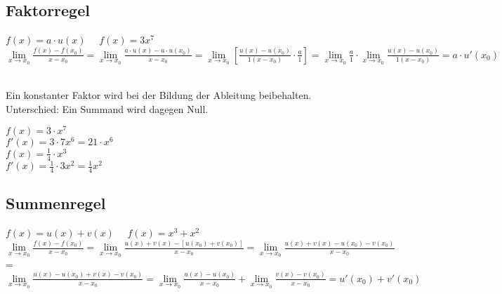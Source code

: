 \subsection{Faktorregel}
$f(x) = a\cdot u(x)\quad$ \zB $f(x)=3x^7$\\
$\lim\limits_{x \rightarrow x_0}{\frac{f(x)-f(x_0)}{x-x_0}} =
\lim\limits_{x \rightarrow x_0}{\frac{a\cdot u(x)-a\cdot u(x_0)}{x-x_0}} =
\lim\limits_{x \rightarrow x_0}{[\frac{u(x)-u(x_0)}{1(x-x_0)}\cdot\frac{a}{1}]} =
\lim\limits_{x \rightarrow x_0}{\frac{a}{1}}\cdot\lim\limits_{x \rightarrow x_0}{\frac{u(x)-u(x_0)}{1(x-x_0)}} =
a\cdot u'(x_0)$

\vspace{0.2cm}
\\
Ein konstanter Faktor wird bei der Bildung der Ableitung beibehalten.\\
Unterschied: Ein Summand wird dagegen Null.

\begin{multicols}{2}
$f(x) = 3\cdot x^7$\\
$f'(x) = 3\cdot 7x^6 = 21\cdot x^6$\\
$f(x) = \frac{1}{4}\cdot x^3$\\
$f'(x) = \frac{1}{4}\cdot 3x^2 = \frac{1}{4}x^2$
\end{multicols}


\subsection{Summenregel}
$f(x) = u(x)+v(x)\quad$ \zB $f(x)=x^3+x^2$\\
$\lim\limits_{x \rightarrow x_0}{\frac{f(x)-f(x_0)}{x-x_0}} =
\lim\limits_{x \rightarrow x_0}{\frac{u(x)+v(x)-[u(x_0)+v(x_0)]}{x-x_0}} =
\lim\limits_{x \rightarrow x_0}{\frac{u(x)+v(x)-u(x_0)-v(x_0)}{x-x_0}}$=\\
$\lim\limits_{x \rightarrow x_0}{\frac{u(x)-u(x_0)+v(x)-v(x_0)}{x-x_0}} =
\lim\limits_{x \rightarrow x_0}{\frac{u(x)-u(x_0)}{x-x_0}}+\lim\limits_{x \rightarrow x_0}{\frac{v(x)-v(x_0)}{x-x_0}} =
u'(x_0) + v'(x_0)$

\vspace{0.2cm}


